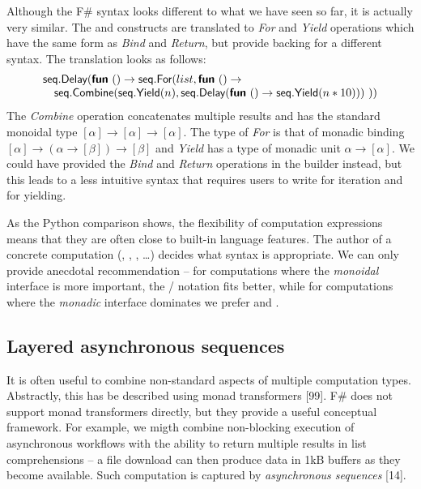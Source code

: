\documentclass[runningheads,a4paper]{llncs}
\begin{document}
Although the F\# syntax looks different to what we have seen so far, it is actually very
similar. The  and  constructs are translated to \emph{For} and 
\emph{Yield} operations which have the same form as \emph{Bind} and \emph{Return}, but provide
backing for a different syntax. The translation looks as follows:
%
\begin{equation*}
\begin{array}{l}
\textnormal{\sffamily seq}.\textnormal{\sffamily Delay}(\textnormal{\bfseries\sffamily fun}~() \rightarrow \textnormal{\sffamily seq}.\textnormal{\sffamily For}(list, \textnormal{\bfseries\sffamily fun}~() \rightarrow \\
\quad \textnormal{\sffamily seq}.\textnormal{\sffamily Combine}(\textnormal{\sffamily seq}.\textnormal{\sffamily Yield}(n), \textnormal{\sffamily seq}.\textnormal{\sffamily Delay}(\textnormal{\bfseries\sffamily fun}~() \rightarrow 
   \textnormal{\sffamily seq}.\textnormal{\sffamily Yield}(n * 10)))~))
\end{array}
\end{equation*}
%
The \emph{Combine} operation concatenates multiple results and has the standard monoidal type
$[\alpha] \rightarrow [\alpha] \rightarrow [\alpha]$. The type of \emph{For} is that of monadic 
binding $[\alpha] \rightarrow (\alpha \rightarrow [\beta]) \rightarrow [\beta]$ and \emph{Yield} has a
type of monadic unit $\alpha \rightarrow [\alpha]$. We could have provided the \emph{Bind} 
and \emph{Return} operations in the  builder instead, but this leads to a less intuitive
syntax that requires users to write  for iteration and  for yielding.

As the Python comparison shows, the flexibility of computation expressions means that they
are often close to built-in language features. The author of a concrete computation (, 
, , \ldots) decides what syntax is appropriate. We can only provide 
anecdotal recommendation -- for computations where the \emph{monoidal} interface is more important, 
the / notation fits better, while for computations where
the \emph{monadic} interface dominates we prefer  and .


\subsection{Layered asynchronous sequences}
\label{sec:intro-asyncseq}

It is often useful to combine non-standard aspects of multiple computation types. Abstractly,
this has be described using monad transformers [99]. F\# does not support monad transformers directly, 
but they provide a useful conceptual framework. For example, we migth combine 
non-blocking execution of asynchronous workflows with the ability to return multiple results in 
list comprehensions -- a file download can then produce data in 1kB buffers as they become available. 
Such computation is captured by \emph{asynchronous sequences} [14].
\end{document}
